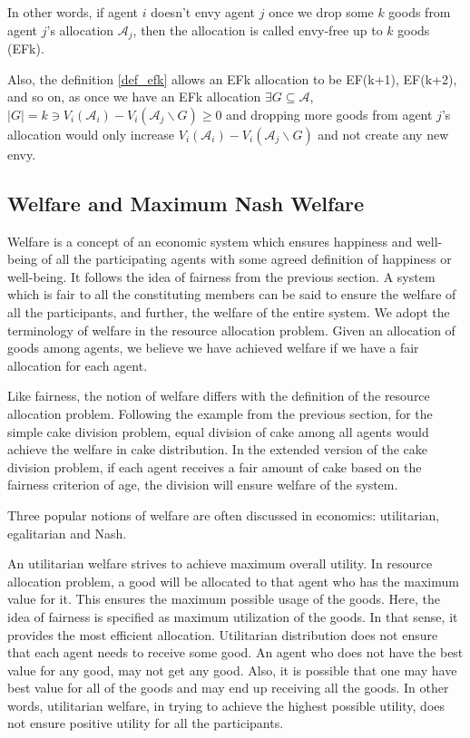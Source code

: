 In other words, if agent $i$ doesn't envy agent $j$ once we drop some $k$ goods from agent $j$'s allocation $\mathcal{A}_j$, then the allocation is called envy-free up to $k$ goods (EFk).

Also, the definition \ref{def_efk} allows an EFk allocation to be EF(k+1), EF(k+2), and so on, as once we have an EFk allocation $ \exists G \subseteq \mathcal{A}$, $ |G|=k \ni V_i(\mathcal{A}_i) - V_i(\mathcal{A}_j \backslash G) \geq 0 $ and dropping more goods from agent $j$'s allocation would only increase $V_i(\mathcal{A}_i) - V_i(\mathcal{A}_j \backslash G)$ and not create any new envy.


\subsection{Welfare and Maximum Nash Welfare}
\label{section_welfare}
Welfare is a concept of an economic system which ensures happiness and well-being of all the participating agents with some agreed definition of happiness or well-being. It follows the idea of fairness from the previous section. A system which is fair to all the constituting members can be said to ensure the welfare of all the participants, and further, the welfare of the entire system. We adopt the terminology of welfare in the resource allocation problem. Given an allocation of goods among agents, we believe we have achieved welfare if we have a fair allocation for each agent.

Like fairness, the notion of welfare differs with the definition of the resource allocation problem. Following the example from the previous section, for the simple cake division problem, equal division of cake among all agents would achieve the welfare in cake distribution. In the extended version of the cake division problem, if each agent receives a fair amount of cake based on the fairness criterion of age, the division will ensure welfare of the system.

Three popular notions of welfare are often discussed in economics: utilitarian, egalitarian and Nash.

An utilitarian welfare strives to achieve maximum overall utility. In resource allocation problem, a good will be allocated to that agent who has the maximum value for it. This ensures the maximum possible usage of the goods. Here, the idea of fairness is specified as maximum utilization of the goods. In that sense, it provides the most efficient allocation. Utilitarian distribution does not ensure that each agent needs to receive some good. An agent who does not have the best value for any good, may not get any good. Also, it is possible that one may have best value for all of the goods and may end up receiving all the goods. In other words, utilitarian welfare, in trying to achieve the highest possible utility, does not ensure positive utility for all the participants.

